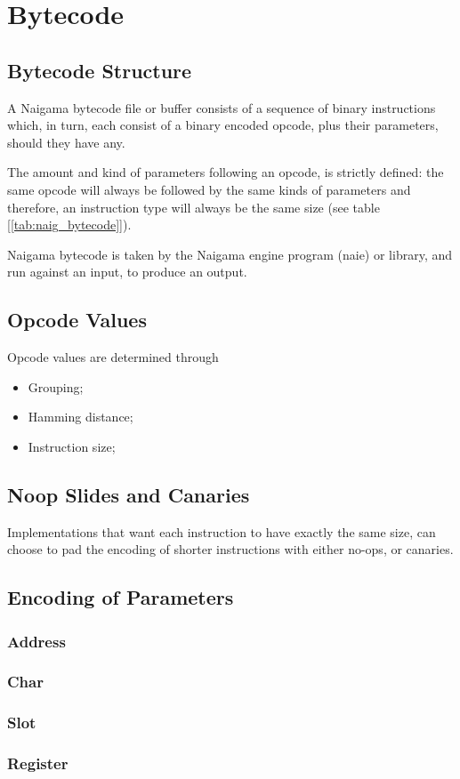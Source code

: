 \section{Bytecode}
\label{sec:bytecode}



\subsection{Bytecode Structure}

A Naigama bytecode file or buffer consists of a sequence of binary
instructions which, in turn, each consist of a binary
encoded opcode, plus their parameters, should they have any.

The amount and kind of parameters following an opcode, is strictly
defined:
the same opcode will always be followed by the same kinds of parameters
and therefore, an instruction type will always be the same size
(see table [\ref{tab:naig_bytecode}]).

Naigama bytecode is taken by the Naigama engine program (naie) or
library, and run against an input, to produce an output.

\subsection{Opcode Values}

Opcode values are determined through

\begin{itemize}
\item Grouping; 
\item Hamming distance;
\item Instruction size;
\end{itemize}

\subsection{Noop Slides and Canaries}

Implementations that want each instruction to have exactly the
same size, can choose to pad the encoding of shorter instructions
with either no-ops, or canaries.

\subsection{Encoding of Parameters}

\subsubsection{Address}

\subsubsection{Char}

\subsubsection{Slot}

\subsubsection{Register}
